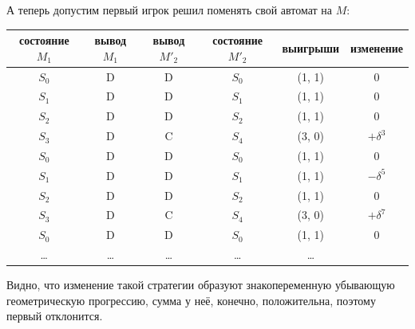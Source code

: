 \documentclass{article}
\theoremstyle{definition}
\theoremstyle{remark}
\begin{document}
А теперь допустим первый игрок решил поменять свой автомат на $M$:
\begin{center}
	\begin{tabular}{|c|c|c|c|c|c|}
		\hline
		состояние $M_1$ & вывод $M_1$ & вывод $M'_2$ & состояние $M'_2$ & выигрыши & изменение \\
		\hline
		$S_0$ & D & D & $S_0$ & (1, 1) & $0$\\
		\hline
		$S_1$ & D & D & $S_1$ & (1, 1) & $0$\\
		\hline
		$S_2$ & D & D & $S_2$ & (1, 1) & $0$\\
		\hline
		$S_3$ & D & C & $S_4$ & (3, 0) & $+\delta^3$\\
		\hline
		$S_0$ & D & D & $S_0$ & (1, 1) & $0$ \\
		\hline
		$S_1$ & D & D & $S_1$ & (1, 1) & $-\delta^5$\\
		\hline
		$S_2$ & D & D & $S_2$ & (1, 1) & $0$\\
		\hline
		$S_3$ & D & C & $S_4$ & (3, 0) & $+\delta^7$\\
		\hline
		$S_0$ & D & D & $S_0$ & (1, 1) & $0$\\
		\hline
		\ldots & \ldots & \ldots & \ldots & \ldots \\
		\hline
	\end{tabular}
\end{center}

Видно, что изменение такой стратегии образуют знакопеременную убывающую геометрическую прогрессию,
сумма у неё, конечно, положительна, поэтому первый отклонится.
\end{document}
